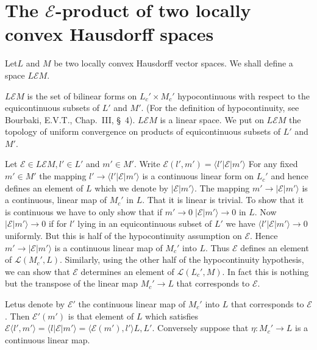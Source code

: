 
\chapter{The \texorpdfstring{$\mathcal{E}$}{E}-product of two locally convex Hausdorff
  spaces}\label{chap4}


Let\pageoriginale $L$ and $M$ be two locally convex Hausdorff vector spaces. We
shall define a space $L \mathcal{E} M$.

\setcounter{section}{4}
\setcounter{definition}{0}
\begin{definition}\label{chap4:def4.1}
$L \mathcal{E} M$ is the set of bilinear forms on $L_c' \times M_c'$
  hypocontinuous with respect to the equicontinuous subsets of $L'$
  and $M'$. (For the definition of hypocontinuity, see Bourbaki,
  E.V.T., Chap.~III, \S~4). $L \mathcal{E} M$ is a linear space. We
  put on $L \mathcal{E} M$ the topology of uniform convergence on
  products of equicontinuous subsets of $L'$ and $M'$.
\end{definition}

Let $\mathscr{E} \in L \mathcal{E} M, l' \in L'$ and $m' \in M'$. Write
$\mathscr{E}(l',m')=\langle l'|\mathscr{E}|m'\rangle$  For any fixed $m'\in M'$ the
mapping $l' \to \langle l'|\mathscr{E}|m'\rangle$ is a continuous linear form
on $L_c'$ and hence defines an element of $L$ which we denote by
$|\mathscr{E}|m'\rangle$. The mapping $m' \to |\mathscr{E}|m'\rangle$ is a
continuous, linear map of $M_c'$ in $L$. That it is linear is
trivial. To show that it is continuous we have to only show that if
$m' \to 0\;|\mathscr{E} |m'\rangle \to 0$ in $L$. Now $|\mathscr{E}|m'\rangle \to 0$
if for $l'$ lying in an equicontinuous subset of $L'$ we have $\langle
l'|\mathscr{E}| m'\rangle \to 0$ uniformly. But this is half of the
hypocontinuity assumption on $\mathscr{E}$. Hence $m'\to|\mathscr{E}|m'\rangle$ is a
continuous linear map of $M_c'$ into $L$. Thus $\mathscr{E}$ defines an
element of $\mathscr{L}(M_c', L)$. Similarly, using the other half of
the hypocontinuity hypothesis, we can show that $\mathscr{E}$ determines an
element of $\mathscr{L}(L_c', M)$. In fact this is nothing but the
transpose of the linear map $M_c' \to L$ that corresponds to $\mathscr{E}$.

Let\pageoriginale us denote by $\mathscr{E}'$ the continuous linear
map of $M_c'$ into $L$ that corresponds to $\mathscr{E}$. Then
$\mathscr{E}'(m')$ is that element of $L$ which satisfies
$\mathscr{E}\langle l', m'\rangle = \langle l|\mathscr{E}|m'\rangle =
\langle \mathscr{E}(m'), l'\rangle L, L'$. Conversely suppose that  
$\eta:M_c' \to L$ is a continuous linear map.

